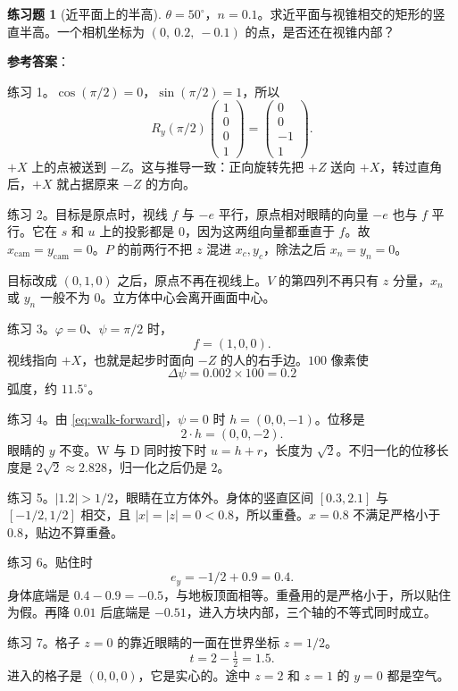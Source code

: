 \documentclass[12pt,a4paper]{article}
\theoremstyle{definition}
\newtheorem{exercise}{练习题}
\theoremstyle{plain}
\theoremstyle{remark}
\begin{document}
\begin{exercise}[近平面上的半高]
$\theta=50^\circ$，$n=0.1$。求近平面与视锥相交的矩形的竖直半高。一个相机坐标为 $(0,\ 0.2,\ -0.1)$ 的点，是否还在视锥内部？
\end{exercise}

\textbf{参考答案}：

练习 1。$\cos(\pi/2)=0$，$\sin(\pi/2)=1$，所以
\[
R_y(\pi/2)\begin{pmatrix}1\\0\\0\\1\end{pmatrix}
=\begin{pmatrix}0\\0\\-1\\1\end{pmatrix}.
\]
$+X$ 上的点被送到 $-Z$。这与推导一致：正向旋转先把 $+Z$ 送向 $+X$，转过直角后，$+X$ 就占据原来 $-Z$ 的方向。

练习 2。目标是原点时，视线 $f$ 与 $-e$ 平行，原点相对眼睛的向量 $-e$ 也与 $f$ 平行。它在 $s$ 和 $u$ 上的投影都是 $0$，因为这两组向量都垂直于 $f$。故 $x_{\mathrm{cam}}=y_{\mathrm{cam}}=0$。$P$ 的前两行不把 $z$ 混进 $x_c,y_c$，除法之后 $x_n=y_n=0$。

目标改成 $(0,1,0)$ 之后，原点不再在视线上。$V$ 的第四列不再只有 $z$ 分量，$x_n$ 或 $y_n$ 一般不为 $0$。立方体中心会离开画面中心。

练习 3。$\varphi=0$、$\psi=\pi/2$ 时，
\[
f=(1,0,0).
\]
视线指向 $+X$，也就是起步时面向 $-Z$ 的人的右手边。$100$ 像素使
\[
\Delta\psi=0.002\times 100=0.2
\]
弧度，约 $11.5^\circ$。

练习 4。由 \eqref{eq:walk-forward}，$\psi=0$ 时 $h=(0,0,-1)$。位移是
\[
2\cdot h=(0,0,-2).
\]
眼睛的 $y$ 不变。W 与 D 同时按下时 $u=h+r$，长度为 $\sqrt{2}$。不归一化的位移长度是 $2\sqrt{2}\approx 2.828$，归一化之后仍是 $2$。

练习 5。$|1.2|>1/2$，眼睛在立方体外。身体的竖直区间 $[0.3,2.1]$ 与 $[-1/2,1/2]$ 相交，且 $|x|=|z|=0<0.8$，所以重叠。$x=0.8$ 不满足严格小于 $0.8$，贴边不算重叠。

练习 6。贴住时
\[
e_y=-1/2+0.9=0.4.
\]
身体底端是 $0.4-0.9=-0.5$，与地板顶面相等。重叠用的是严格小于，所以贴住为假。再降 $0.01$ 后底端是 $-0.51$，进入方块内部，三个轴的不等式同时成立。

练习 7。格子 \(z=0\) 的靠近眼睛的一面在世界坐标 \(z=1/2\)。
\[
t=2-\tfrac12=1.5.
\]
进入的格子是 \((0,0,0)\)，它是实心的。途中 \(z=2\) 和 \(z=1\) 的 \(y=0\) 都是空气。
\end{document}
